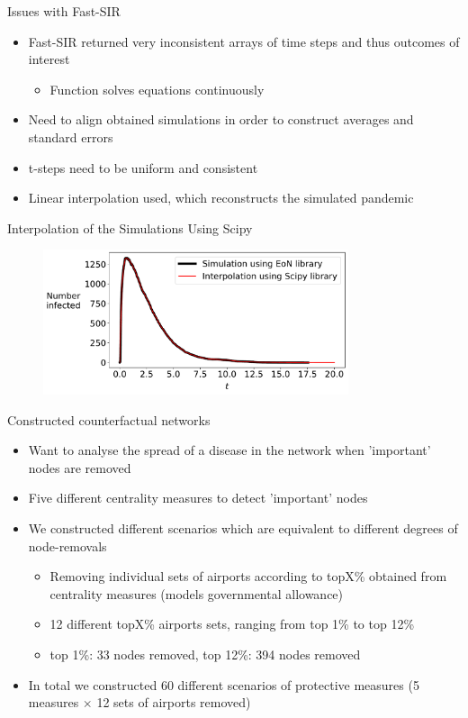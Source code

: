 \documentclass[10pt]{beamer}
\begin{document}
\begin{frame}{Issues with Fast-SIR}
\begin{itemize}    
\item Fast-SIR returned very inconsistent arrays of time steps and thus outcomes of interest
\begin{itemize}
     \item Function solves equations continuously
     \end{itemize}
\item Need to align obtained simulations in order to construct averages and standard errors
\item t-steps need to be uniform and consistent
\item Linear interpolation used, which reconstructs the simulated pandemic

 \end{itemize}
\end{frame}

\begin{frame}{Interpolation of the Simulations Using Scipy}
\begin{figure}
\begin{center}
    \includegraphics[width=0.8\textwidth]{Figures/interpolation_test.pdf}
\end{center}
\end{figure}
\end{frame}

\begin{frame}{Constructed counterfactual networks}
\begin{itemize}
\item Want to analyse the spread of a disease in the network when 'important' nodes are removed
\item Five different centrality measures to detect 'important' nodes
\item We constructed different scenarios which are equivalent to different degrees of node-removals
\begin{itemize}
     \item Removing individual sets of airports according to topX\% obtained from centrality measures (models governmental allowance)
     \item 12 different topX\% airports sets, ranging from top 1\% to top 12\%
     \item top 1\%: 33 nodes removed, top 12\%: 394 nodes removed
     \end{itemize}
\item In total we constructed 60 different scenarios of protective measures (5 measures $\times$ 12 sets of airports removed)
 \end{itemize}
\end{frame}
\end{document}
